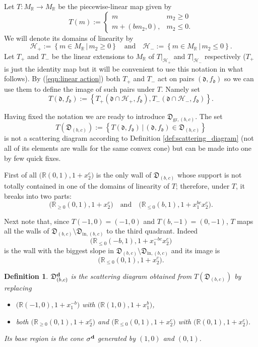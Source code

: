 \documentclass[10pt]{amsart}
\newtheorem{defn}[theorem]{Definition}
\theoremstyle{remark}
\numberwithin{equation}{section}
\newcommand{\RR}{\mathbb{R}}
\newcommand{\fd}{\mathfrak{d}}
\newcommand{\fD}{\mathfrak{D}}
\newcommand{\bfd}{{\bf d}}
\begin{document}
Let $T:M_\RR\rightarrow M_\RR$ be the piecewise-linear map given by
\[
  T (m) := 
  \begin{cases}
    m   & m_2 \geq 0 \\
    m + (bm_2,0), & m_2 \leq 0.
  \end{cases}
\]
We will denote its domains of linearity by 
\[ 
  \mathcal{H}_{+} := 
  \left\{ m \in M_{\mathbb{R}}\, |\, m_2 \geq 0 \right\} 
  \quad
  \mbox{and}
  \quad
  \mathcal{H}_{-} := 
  \left\{ m \in M_{\mathbb{R}} \,|\, m_2 \leq 0 \right\}.
\]
Let $T_+$ and $T_-$ be the linear extensions to $M_\RR$ of $T|_{\mathcal{H}_+}$
and $T|_{\mathcal{H}_-}$ respectively ($T_+$ is just the identity map but it
will be convenient to use this notation in what follows). 
By (\ref{eqn:linear action}) both $T_+$ and $T_-$ act on pairs $(\fd,f_\fd)$ so
we can use them to define the image of such pairs under $T$. Namely set
\[
  T(\fd,f_\fd):=
  \left\{
    T_+\left(\fd\cap\mathcal{H}_+,f_\fd\right),
    T_-\left(\fd\cap\mathcal{H}_-,f_\fd\right)
  \right\}.
\]

Having fixed the notation we are ready to introduce $\fD_{\mathrm{gr},(b,c)}$.
The set
\[
  T(\fD_{(b,c)}):=
  \left\{
    T(\fd,f_\fd)\, |\, (\fd,f_\fd)\in \fD_{(b,c)}
  \right\}
\]
is not a scattering diagram according to Definition 
\ref{def:scattering_diagram} (not all of its elements are walls for the same
convex cone) but can be made into one by few quick fixes.

First of all $\big( \RR (0,1), 1+x_2^c\big)$ is the only wall of $\fD_{(b,c)}$
whose support is not totally contained in one of the domains of linearity of
$T$; therefore, under $T$, it breaks into two parts:
\[
  \big( \RR_{\ge0} (0,1), 1+x_2^c\big)
  \quad
  \mbox{and}
  \quad
  \big( \RR_{\le 0} (b,1), 1+x_1^{bc}x_2^c\big).
\]

Next note that, since $T(-1,0)=(-1,0)$ and $T(b,-1)=(0,-1)$, $T$ maps all the
walls of $\fD_{(b,c)}\setminus\fD_{\mathrm{in},(b,c)}$ to the third quadrant. 
Indeed 
\[
  \big(\RR_{\leq0}(-b,1),1+x_1^{-bc}x_2^c\big)
\]
is the wall with the biggest slope in
$\fD_{(b,c)}\setminus\fD_{\mathrm{in},(b,c)}$ and its image is 
\[
  \big( \RR_{\le0} (0,1), 1+x_2^c\big).
\]

\begin{defn}
  $\fD_{(b,c)}^\bfd$ is the scattering diagram obtained from
  $T\left(\fD_{(b,c)}\right)$ by replacing 
  \begin{itemize}
    \item
      $\big(\RR (-1,0), 1+x_1^{-b}\big)$ with $\big(\RR  (1,0), 1+x_1^b\big)$,
    \item 
      both $ \big( \RR_{\ge0} (0,1), 1+x_2^c\big)$ and $\big( \RR_{\le0} (0,1),
      1+x_2^c\big)$ with $ \big( \RR (0,1), 1+x_2^c\big)$.
  \end{itemize}
  Its base region is the cone $\sigma^\bfd$ generated by $(1,0)$ and $(0,1)$.
\end{defn}
\end{document}
